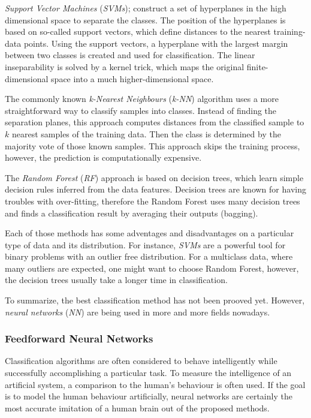 \textit{Support Vector Machines} (\textit{SVMs}); \citep{article:svm} construct a set of hyperplanes in the high dimensional space to separate the classes. The position of the hyperplanes is based on so-called support vectors, which define distances to the nearest training-data points. Using the support vectors, a hyperplane with the largest margin between two classes is created and used for classification. The linear inseparability is solved by a kernel trick, which maps the original finite-dimensional space into a much higher-dimensional space.

The commonly known \textit{k-Nearest Neighbours} (\textit{k-NN}) algorithm uses a more straightforward way to classify samples into classes. Instead of finding the separation planes, this approach computes distances from the classified sample to $ k $ nearest samples of the training data. Then the class is determined by the majority vote of those known samples. This approach skips the training process, however, the prediction is computationally expensive.

The \textit{Random Forest} (\textit{RF}) approach \citep{article:rf} is based on decision trees, which learn simple decision rules inferred from the data features. Decision trees are known for having troubles with over-fitting, therefore the Random Forest uses many decision trees and finds a classification result by averaging their outputs (bagging).

Each of those methods has some adventages and disadvantages on a particular type of data and its distribution. For instance, \textit{SVMs} are a powerful tool for binary problems with an outlier free distribution. For a multiclass data, where many outliers are expected, one might want to choose Random Forest, however, the decision trees usually take a longer time in classification.

To summarize, the best classification method has not been prooved yet. However, \textit{neural networks} (\textit{NN}) are being used in more and more fields nowadays.  

\subsubsection*{Feedforward Neural Networks} \label{ssec:intro_to_nn}
Classification algorithms are often considered to behave intelligently while successfully accomplishing a particular task. To measure the intelligence of an artificial system, a comparison to the human's behaviour is often used. If the goal is to model the human behaviour artificially, neural networks are certainly the most accurate imitation of a human brain out of the proposed methods.


